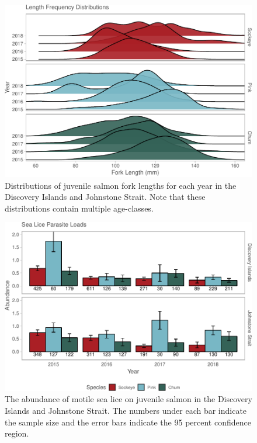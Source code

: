 \documentclass[fleqn,10pt]{wlpeerj} %
\begin{document}
\begin{figure}[H]
\includegraphics[width=0.9\linewidth]{Migration_Observations_Report_files/figure-latex/lengthplot-1} \caption{Distributions of juvenile salmon fork lengths for each year in the Discovery Islands and Johnstone Strait. Note that these distributions contain multiple age-classes.}\label{fig:lengthplot}
\end{figure}

\begin{figure}[H]
\includegraphics[width=0.9\linewidth]{Migration_Observations_Report_files/figure-latex/sealice-1} \caption{The abundance of motile sea lice on juvenile salmon in the Discovery Islands and Johnstone Strait. The numbers under each bar indicate the sample size and the error bars indicate the 95 percent confidence region.}\label{fig:sealice}
\end{figure}
\end{document}
